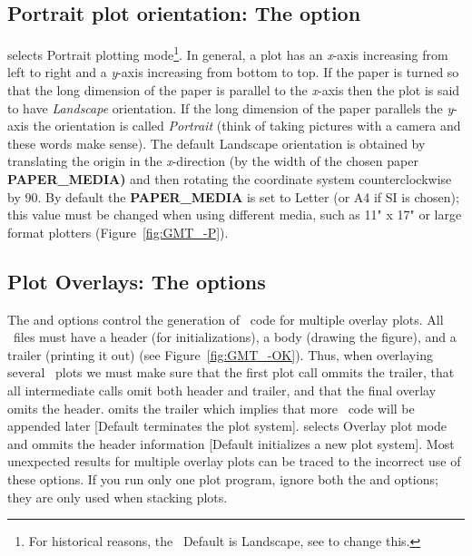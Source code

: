 \subsection{Portrait plot orientation: The  option} 


 selects Portrait plotting mode\footnote{For historical reasons, the \GMT\
Default is Landscape, see  to change this.}.  In general,
a plot has an {\it x}-axis increasing from left to
right and a {\it y}-axis increasing from bottom to top.  If the
paper is turned so that the long dimension of the paper is
parallel to the {\it x}-axis then the plot is said to have
\emph{Landscape} orientation.  If the long dimension of
the paper parallels the {\it y}-axis the orientation is called
\emph{Portrait} (think of taking pictures with a camera
and these words make sense).  The
default Landscape orientation is obtained by translating the origin in the
{\it x}-direction (by the width of the chosen paper {\bf PAPER\_MEDIA)} and then rotating the
coordinate system counterclockwise by 90\DS.  By default the {\bf PAPER\_MEDIA} is
set to Letter (or A4 if SI is chosen); this value must be changed
when using different media, such as 11" x 17" or large format plotters
(Figure~\ref{fig:GMT_-P}).


\subsection{Plot Overlays: The   options}


The  and  options control the generation of \PS\ code for multiple
overlay plots.  All \PS\ files must have a header (for initializations),
a body (drawing the figure), and a trailer (printing it out) (see
Figure~\ref{fig:GMT_-OK}).  Thus,
when overlaying several \GMT\ plots we must make sure that the first plot
call ommits the trailer, that all intermediate calls omit both header and
trailer, and that the final overlay omits the header.
 omits the trailer which implies that more \PS\ code will be appended
later [Default terminates the plot system].  \Opt{O} selects Overlay plot
mode and ommits the header information [Default initializes a new plot system].
Most unexpected results for multiple overlay plots can be traced to the
incorrect use of these options.  If you run only one plot
program, ignore both the  and  options; they are
only used when stacking plots. 

